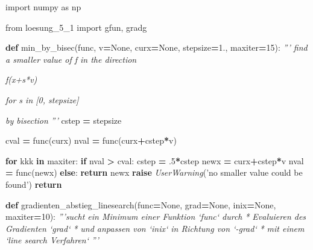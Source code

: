 \documentclass[]{book}
\newenvironment{Shaded}{\begin{snugshade}}{\end{snugshade}}
\newcommand{\CommentTok}[1]{\textcolor[rgb]{0.56,0.35,0.01}{\textit{#1}}}
\newcommand{\ControlFlowTok}[1]{\textcolor[rgb]{0.13,0.29,0.53}{\textbf{#1}}}
\newcommand{\DecValTok}[1]{\textcolor[rgb]{0.00,0.00,0.81}{#1}}
\newcommand{\FloatTok}[1]{\textcolor[rgb]{0.00,0.00,0.81}{#1}}
\newcommand{\ImportTok}[1]{#1}
\newcommand{\KeywordTok}[1]{\textcolor[rgb]{0.13,0.29,0.53}{\textbf{#1}}}
\newcommand{\NormalTok}[1]{#1}
\newcommand{\OperatorTok}[1]{\textcolor[rgb]{0.81,0.36,0.00}{\textbf{#1}}}
\newcommand{\PreprocessorTok}[1]{\textcolor[rgb]{0.56,0.35,0.01}{\textit{#1}}}
\newcommand{\StringTok}[1]{\textcolor[rgb]{0.31,0.60,0.02}{#1}}
\newcommand{\VariableTok}[1]{\textcolor[rgb]{0.00,0.00,0.00}{#1}}
\theoremstyle{definition}
\theoremstyle{definition}
\theoremstyle{definition}
\theoremstyle{definition}
\theoremstyle{remark}
\begin{document}
\begin{Shaded}
\begin{Highlighting}[]
\ImportTok{import}\NormalTok{ numpy }\ImportTok{as}\NormalTok{ np}

\ImportTok{from}\NormalTok{ loesung_5_1 }\ImportTok{import}\NormalTok{ gfun, gradg}


\KeywordTok{def}\NormalTok{ min_by_bisec(func, v}\OperatorTok{=}\VariableTok{None}\NormalTok{, curx}\OperatorTok{=}\VariableTok{None}\NormalTok{, stepsize}\OperatorTok{=}\FloatTok{1.}\NormalTok{, maxiter}\OperatorTok{=}\DecValTok{15}\NormalTok{):}
    \CommentTok{''' find a smaller value of f in the direction}

\CommentTok{    f(x+s*v)}

\CommentTok{    for s in [0, stepsize]}

\CommentTok{    by bisection}
\CommentTok{    '''}
\NormalTok{    cstep }\OperatorTok{=}\NormalTok{ stepsize}

\NormalTok{    cval }\OperatorTok{=}\NormalTok{ func(curx)}
\NormalTok{    nval }\OperatorTok{=}\NormalTok{ func(curx}\OperatorTok{+}\NormalTok{cstep}\OperatorTok{*}\NormalTok{v)}

    \ControlFlowTok{for}\NormalTok{ kkk }\KeywordTok{in}\NormalTok{ maxiter:}
        \ControlFlowTok{if}\NormalTok{ nval }\OperatorTok{>}\NormalTok{ cval:}
\NormalTok{            cstep }\OperatorTok{=} \FloatTok{.5}\OperatorTok{*}\NormalTok{cstep}
\NormalTok{            newx }\OperatorTok{=}\NormalTok{ curx}\OperatorTok{+}\NormalTok{cstep}\OperatorTok{*}\NormalTok{v}
\NormalTok{            nval }\OperatorTok{=}\NormalTok{ func(newx)}
        \ControlFlowTok{else}\NormalTok{:}
            \ControlFlowTok{return}\NormalTok{ newx}
    \ControlFlowTok{raise} \PreprocessorTok{UserWarning}\NormalTok{(}\StringTok{'no smaller value could be found'}\NormalTok{)}
    \ControlFlowTok{return}



\KeywordTok{def}\NormalTok{ gradienten_abstieg_linesearch(func}\OperatorTok{=}\VariableTok{None}\NormalTok{, grad}\OperatorTok{=}\VariableTok{None}\NormalTok{, inix}\OperatorTok{=}\VariableTok{None}\NormalTok{,}
\NormalTok{                                  maxiter}\OperatorTok{=}\DecValTok{10}\NormalTok{):}
    \CommentTok{'''sucht ein Minimum einer Funktion `func` durch}
\CommentTok{     * Evaluieren des Gradienten `grad`}
\CommentTok{     * und anpassen von `inix` in Richtung von `-grad`}
\CommentTok{     * mit einem `line search Verfahren`}
\CommentTok{    '''}


\end{Highlighting}
\end{Shaded}
\end{document}
